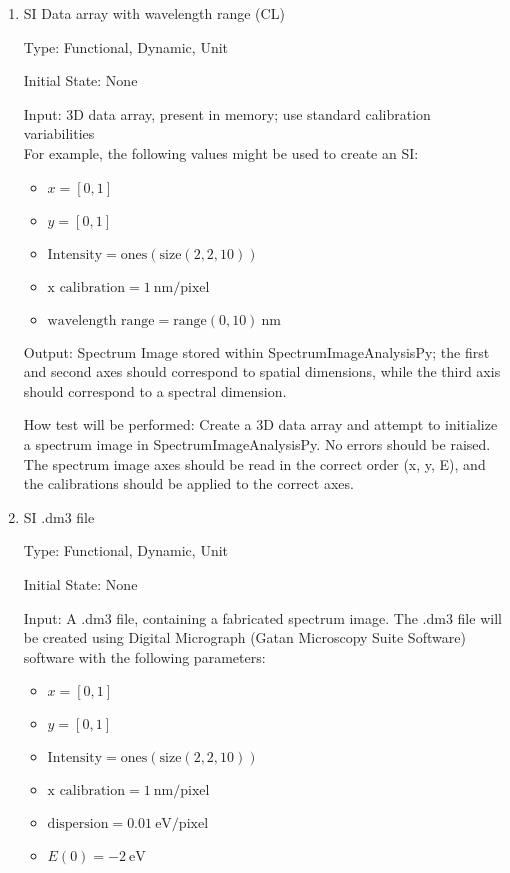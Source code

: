 \documentclass[12pt, titlepage]{article}
\newcommand{\progname}{SpectrumImageAnalysisPy}
\begin{document}
\begin{enumerate}
Output: Spectrum Image stored within \progname{}; the first and second axes should correspond to spatial dimensions, while the third axis should correspond to a spectral dimension.

How test will be performed: Create a 3D data array and attempt to initialize a spectrum image in \progname{}. No errors should be raised. The spectrum image axes should be read in the correct order (x, y, E), and the calibrations should be applied to the correct axes.


\item{SI Data array with wavelength range (CL)}

Type: Functional, Dynamic, Unit

Initial State: None

Input: 3D data array, present in memory; use standard calibration variabilities\\
For example, the following values might be used to create an SI: 
\begin{itemize}
	\item $x = [0, 1]$
	\item $y = [0, 1]$
	\item $\text{Intensity} = \text{ones}(\text{size}(2,2,10))$
	\item $\text{x calibration} = 1\ \si{\nano\metre}/\text{pixel}$
	\item $\text{wavelength range} = \text{range}(0, 10)\ \si{\nano\metre}$
\end{itemize}

Output: Spectrum Image stored within \progname{}; the first and second axes should correspond to spatial dimensions, while the third axis should correspond to a spectral dimension.

How test will be performed: Create a 3D data array and attempt to initialize a spectrum image in \progname{}. No errors should be raised. The spectrum image axes should be read in the correct order (x, y, E), and the calibrations should be applied to the correct axes.


\item{SI .dm3 file}

Type: Functional, Dynamic, Unit

Initial State: None

Input: A .dm3 file, containing a fabricated spectrum image. The .dm3 file will be created using Digital Micrograph (Gatan Microscopy Suite Software) software \cite{noauthor_gatan_nodate} with the following parameters:
\begin{itemize}
	\item $x = [0, 1]$
	\item $y = [0, 1]$
	\item $\text{Intensity} = \text{ones}(\text{size}(2,2,10))$
	\item $\text{x calibration} = 1\ \si{\nano\metre}/\text{pixel}$
	\item $\text{dispersion} = 0.01\ \si{\electronvolt}/\text{pixel}$
	\item $E(0) = -2\ \si{\electronvolt}$
\end{itemize}


\end{enumerate}
\end{document}
